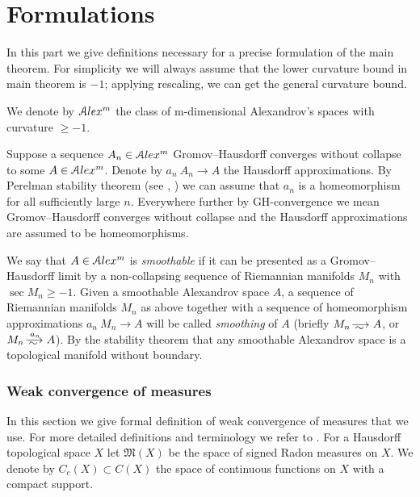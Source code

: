 \part{Formulations}

In this part we give definitions necessary for a precise formulation 
of the main theorem.
For simplicity  we will always assume that the lower
curvature bound in main theorem is  $-1$;
applying rescaling, we can get the general curvature bound.

We denote by
$\mathcal{A}lex^m$ the class of m-dimensional Alexandrov's spaces
with curvature $\ge -1$.

Suppose a sequence $A_n\in \mathcal{A}lex^m$ Gromov--Hausdorff converges without collapse to some
$A\in \mathcal{A}lex^m$.
Denote by $a_n\:A_n\to A$ the Hausdorff approximations.
By Perelman stability theorem (see \cite{PerStab}, \cite{KapStab}) we can assume that $a_n$ is a homeomorphism for all sufficiently large $n$.
Everywhere further by GH-convergence we mean 
Gromov--Hausdorff converges without collapse and the Hausdorff approximations are assumed to be homeomorphisms.


We say that $A\in \mathcal{A}lex^m$ is \emph{smoothable}
if it can be presented as a Gromov--Hausdorff limit by a non-collapsing sequence of Riemannian manifolds $M_n$ with $\sec M_n\ge-1$.
Given a smoothable Alexandrov space $A$,
a sequence of Riemannian manifolds $M_n$ as above
together with a sequence of homeomorphism approximations $a_n\:M_n\to A$
will be called \emph{smoothing} of $A$
(briefly $M_n\smooths{} A$, or $M_n\smooths{a_n} A$).
By the stability theorem that any smoothable Alexandrov space is a topological manifold without boundary.






 
 
 
\section{Weak convergence of measures}

In this section we give formal definition of weak convergence of measures
that we use.
For more detailed definitions and terminology we refer to
\cite{GMS}.
For a Hausdorff topological space $X$ let
$\mathfrak M(X)$ be the space of signed Radon measures on $X$.
We denote by $C_c(X)\subset C(X)$  the space of continuous functions on $X$
with a compact support. 

